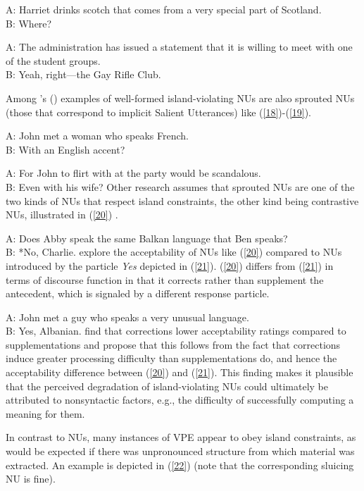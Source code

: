 \documentclass[output=paper
                ,modfonts
                ,nonflat
	        ,collection
	        ,collectionchapter
	        ,collectiontoclongg
 	        ,biblatex
                ,babelshorthands
                ,newtxmath
                ,draftmode
                ,colorlinks, citecolor=brown
]{./langsci/langscibook}
\begin{document}
{\ea A: Harriet drinks scotch that comes from a very special part of Scotland.\\B: Where? \citep[245]{CJ2005a} \label{16}\z

\ea A: The administration has issued a statement that it is willing to meet with one of the student groups.\\B: Yeah, right---the Gay Rifle Club. \citep[245]{CJ2005a} \label{17}\z

Among \citeauthor{CJ2005a}'s (\citeyear[245]{CJ2005a}) examples of well-formed island-violating NUs are also sprouted NUs (those that correspond to implicit Salient Utterances) like (\ref{18})-(\ref{19}).

\ea A: John met a woman who speaks French.\\B: With an English accent?\label{18}\z

\ea A: For John to flirt with at the party would be scandalous. \\B: Even with his wife?\label{19}\z
Other research assumes that sprouted NUs are one of the two kinds of NUs that respect island constraints, the other kind being contrastive NUs, illustrated in (\ref{20}) \citep{Chung1995, Merchant2001, Griffiths2014}.

\ea A: Does Abby speak the same Balkan language that Ben speaks?\\
B: *No, Charlie. \citep{Merchant2001}  \label{20}\z
%
\citet{Schmeh2015} explore the acceptability of NUs like (\ref{20}) compared to NUs introduced by the particle {\it Yes} depicted in (\ref{21}). (\ref{20}) differs from (\ref{21}) in terms of discourse function in that it corrects rather than supplement the antecedent, which is signaled by a different response particle.

\ea A: John met a guy who speaks a very unusual language. \\B: Yes, Albanian. \citep[245]{CJ2005a} \label{21}\z
%
\citet{Schmeh2015} find that corrections lower acceptability ratings compared to supplementations and propose that this follows from the fact that corrections induce greater processing difficulty than supplementations do, and hence the acceptability difference between (\ref{20}) and (\ref{21}). This finding makes it plausible that the perceived degradation of island-violating NUs could ultimately be attributed to nonsyntactic factors, e.g., the difficulty of successfully computing a meaning for them.

In contrast to NUs, many instances of VPE appear to obey island constraints, as would be expected if there was unpronounced structure from which material was extracted. An example is depicted in (\ref{22}) (note that the corresponding sluicing NU is fine).

}
\end{document}
